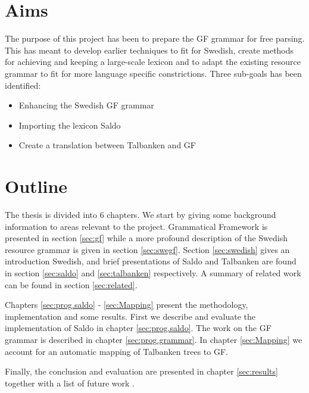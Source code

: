 \documentclass{report}
\begin{document}
\section{Aims}
The purpose of this project has been to prepare the GF grammar for free parsing.
This has meant to develop earlier techniques to fit for Swedish, create methods
for achieving and keeping a large-scale lexicon and to adapt the existing
resource grammar to fit for more language specific constrictions.
Three sub-goals has been identified:
\begin{itemize}
\item Enhancing the Swedish GF grammar
\item Importing the lexicon Saldo
\item Create a translation between Talbanken and GF
\end{itemize}

\newpage %
\section{Outline}
The thesis is divided into 6 chapters. We start by giving some background
information to areas relevant to the project. %
Grammatical Framework is presented in section \ref{sec:gf} while a more profound
description of the Swedish resource grammar is given in section \ref{sec:swegf}.
Section \ref{sec:swedish} gives an introduction Swedish, and
brief presentations of Saldo and Talbanken are found in section \ref{sec:saldo} and
\ref{sec:talbanken} respectively.
A summary of related work can be found in section \ref{sec:related}.

Chapters \ref{sec:prog.saldo} - \ref{sec:Mapping} present the methodology,
implementation and some results. First we describe and evaluate the implementation
of Saldo in chapter \ref{sec:prog.saldo}. The work on the GF grammar is described in
chapter \ref{sec:prog.grammar}.
In chapter \ref{sec:Mapping} we account for an automatic mapping of Talbanken
trees to GF. %


Finally, the conclusion and evaluation are
presented in chapter \ref{sec:results} together with a list of future work .
\end{document}
